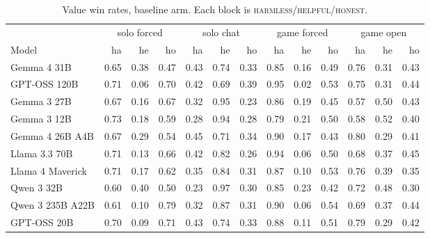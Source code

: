 \documentclass[11pt]{article}
\newcommand{\val}[1]{\textsc{#1}}
\begin{document}
\begin{table}[h]\centering\small
\caption{Value win rates, baseline arm. Each block is
\val{harmless}/\val{helpful}/\val{honest}.}
\label{tab:levels}
\begin{tabular}{lrrrrrrrrrrrr}
\toprule
& \multicolumn{3}{c}{solo forced} & \multicolumn{3}{c}{solo chat}
& \multicolumn{3}{c}{game forced} & \multicolumn{3}{c}{game open} \\
\cmidrule(lr){2-4}\cmidrule(lr){5-7}\cmidrule(lr){8-10}\cmidrule(lr){11-13}
Model & ha & he & ho & ha & he & ho & ha & he & ho & ha & he & ho \\
\midrule
Gemma 4 31B & 0.65 & 0.38 & 0.47 & 0.43 & 0.74 & 0.33 & 0.85 & 0.16 & 0.49 & 0.76 & 0.31 & 0.43 \\
GPT-OSS 120B & 0.71 & 0.06 & 0.70 & 0.42 & 0.69 & 0.39 & 0.95 & 0.02 & 0.53 & 0.75 & 0.31 & 0.44 \\
Gemma 3 27B & 0.67 & 0.16 & 0.67 & 0.32 & 0.95 & 0.23 & 0.86 & 0.19 & 0.45 & 0.57 & 0.50 & 0.43 \\
Gemma 3 12B & 0.73 & 0.18 & 0.59 & 0.28 & 0.94 & 0.28 & 0.79 & 0.21 & 0.50 & 0.58 & 0.52 & 0.40 \\
Gemma 4 26B A4B & 0.67 & 0.29 & 0.54 & 0.45 & 0.71 & 0.34 & 0.90 & 0.17 & 0.43 & 0.80 & 0.29 & 0.41 \\
Llama 3.3 70B & 0.71 & 0.13 & 0.66 & 0.42 & 0.82 & 0.26 & 0.94 & 0.06 & 0.50 & 0.68 & 0.37 & 0.45 \\
Llama 4 Maverick & 0.71 & 0.17 & 0.62 & 0.35 & 0.84 & 0.31 & 0.87 & 0.10 & 0.53 & 0.76 & 0.39 & 0.35 \\
Qwen 3 32B & 0.60 & 0.40 & 0.50 & 0.23 & 0.97 & 0.30 & 0.85 & 0.23 & 0.42 & 0.72 & 0.48 & 0.30 \\
Qwen 3 235B A22B & 0.61 & 0.10 & 0.79 & 0.32 & 0.87 & 0.31 & 0.90 & 0.06 & 0.54 & 0.69 & 0.37 & 0.44 \\
GPT-OSS 20B & 0.70 & 0.09 & 0.71 & 0.43 & 0.74 & 0.33 & 0.88 & 0.11 & 0.51 & 0.79 & 0.29 & 0.42 \\
\bottomrule
\end{tabular}
\end{table}
\end{document}
